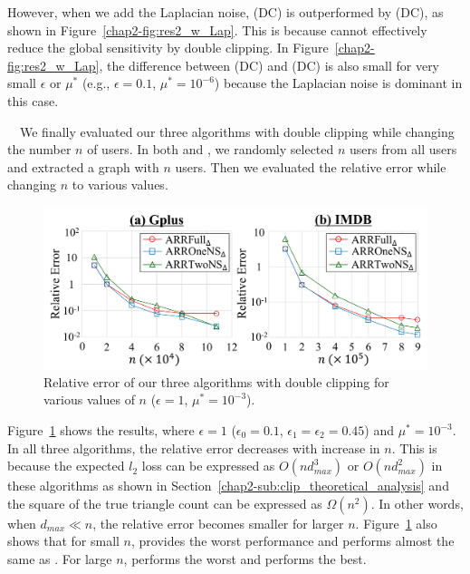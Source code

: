 However, when we add the Laplacian noise, \AlgThree{} (DC) is outperformed by \AlgTwo{} (DC), as shown in Figure~\ref{chap2-fig:res2_w_Lap}. 
This is because \AlgThree{} cannot effectively reduce the global sensitivity by double clipping. 
In Figure~\ref{chap2-fig:res2_w_Lap}, the difference between \AlgTwo{} (DC) and \AlgOne{} (DC) is also small for very small $\epsilon$ or $\mu^*$ (e.g., $\epsilon=0.1$, $\mu^*=10^{-6}$) because the Laplacian noise is dominant in this case. 

\smallskip
{}~~We 
finally 
evaluated our three algorithms with double clipping while changing the number $n$ of users. 
In both \GPlus{} and \IMDB{}, we randomly selected $n$ users from all users and extracted a graph with $n$ users. 
Then we evaluated the relative error while changing $n$ to various values.

\begin{figure}[t]
  \centering
  \includegraphics[width=0.99\linewidth]{fig/res3_n.pdf}
  \vspace{-4mm}
  \caption{Relative error of our three algorithms with double clipping for various values of $n$ 
  ($\epsilon=1$, $\mu^*=10^{-3}$).} 
  \label{chap2-fig:res3_n}
\end{figure}

Figure~\ref{chap2-fig:res3_n} shows the results, where $\epsilon=1$ ($\epsilon_0=0.1$, $\epsilon_1 = \epsilon_2 = 0.45$) and $\mu^* = 10^{-3}$. 
In all 
three algorithms, the relative error decreases with increase in $n$.
This is because the expected $l_2$ loss can be expressed as 
$O(n d_{max}^3)$ or $O(n d_{max}^2)$ 
in these algorithms as shown in Section~\ref{chap2-sub:clip_theoretical_analysis} and the square of the true triangle count can be expressed as $\Omega(n^2)$.
In other words, when $d_{max} \ll n$, the relative error becomes smaller for larger $n$. 
Figure~\ref{chap2-fig:res3_n} also shows that for small $n$, \AlgThree{} provides the worst performance and 
\AlgTwo{} performs almost the same as \AlgOne{}. 
For large $n$, 
\AlgOne{} performs the worst and 
\AlgTwo{} performs the best. 


